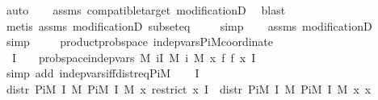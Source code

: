 \begin{isabellebody}
\ auto{\isacharbrackleft}{\kern0pt}{}{\isacharbrackright}{\kern0pt}\isanewline
\ \ \isamarkupfalse%
\ assms{\isacharparenleft}{\kern0pt}{}{\isacharparenright}{\kern0pt}\ compatible{\isacharunderscore}{\kern0pt}target\ modificationD{\isacharparenleft}{\kern0pt}{}{\isacharparenright}{\kern0pt}\ \isamarkupfalse%
\ blast\isanewline
\ \ \ \ \isamarkupfalse%
\ {\isacharparenleft}{\kern0pt}metis\ assms\ modificationD{\isacharparenleft}{\kern0pt}{}{\isacharparenright}{\kern0pt}\ subset{\isacharunderscore}{\kern0pt}eq{\isacharparenright}{\kern0pt}\isanewline
\ \ \ \isamarkupfalse%
\ simp\isanewline
\ \ \isamarkupfalse%
\ assms{\isacharparenleft}{\kern0pt}{}{\isacharparenright}{\kern0pt}\ modificationD{\isacharparenleft}{\kern0pt}{}{\isacharparenright}{\kern0pt}\ \isamarkupfalse%
\ simp\isanewline
\ \ \isamarkupfalse%
%
\endisatagproof
{\isafoldproof}%
%
\isadelimproof
\isanewline
%
\endisadelimproof
\isanewline
{}\isamarkupfalse%
\ {\isacharparenleft}{\kern0pt}\ product{\isacharunderscore}{\kern0pt}prob{\isacharunderscore}{\kern0pt}space{\isacharparenright}{\kern0pt}\ indep{\isacharunderscore}{\kern0pt}vars{\isacharunderscore}{\kern0pt}PiM{\isacharunderscore}{\kern0pt}coordinate{\isacharcolon}{\kern0pt}\isanewline
\ \ {\isachardoublequoteopen}I\ {\isasymnoteq}\ {\isacharbraceleft}{\kern0pt}{\isacharbraceright}{\kern0pt}\ {\isasymLongrightarrow}\ prob{\isacharunderscore}{\kern0pt}space{\isachardot}{\kern0pt}indep{\isacharunderscore}{\kern0pt}vars\ {\isacharparenleft}{\kern0pt}{\isasymPi}\isactrlsub M\ i{\isasymin}I{\isachardot}{\kern0pt}\ M\ i{\isacharparenright}{\kern0pt}\ M\ {\isacharparenleft}{\kern0pt}{\isasymlambda}x\ f{\isachardot}{\kern0pt}\ f\ x{\isacharparenright}{\kern0pt}\ I{\isachardoublequoteclose}\isanewline
%
\isadelimproof
%
\endisadelimproof
%
\isatagproof
{}\isamarkupfalse%
\ {\isacharparenleft}{\kern0pt}simp\ add{\isacharcolon}{\kern0pt}\ indep{\isacharunderscore}{\kern0pt}vars{\isacharunderscore}{\kern0pt}iff{\isacharunderscore}{\kern0pt}distr{\isacharunderscore}{\kern0pt}eq{\isacharunderscore}{\kern0pt}PiM{\isacharprime}{\kern0pt}{\isacharparenright}{\kern0pt}\isanewline
\ \ \isamarkupfalse%
\ {\isachardoublequoteopen}I\ {\isasymnoteq}\ {\isacharbraceleft}{\kern0pt}{\isacharbraceright}{\kern0pt}{\isachardoublequoteclose}\isanewline
\ \ \isamarkupfalse%
\ {\isachardoublequoteopen}distr\ {\isacharparenleft}{\kern0pt}Pi\isactrlsub M\ I\ M{\isacharparenright}{\kern0pt}\ {\isacharparenleft}{\kern0pt}Pi\isactrlsub M\ I\ M{\isacharparenright}{\kern0pt}\ {\isacharparenleft}{\kern0pt}{\isasymlambda}x{\isachardot}{\kern0pt}\ restrict\ x\ I{\isacharparenright}{\kern0pt}\ {\isacharequal}{\kern0pt}\ distr\ {\isacharparenleft}{\kern0pt}Pi\isactrlsub M\ I\ M{\isacharparenright}{\kern0pt}\ {\isacharparenleft}{\kern0pt}Pi\isactrlsub M\ I\ M{\isacharparenright}{\kern0pt}\ {\isacharparenleft}{\kern0pt}{\isasymlambda}x{\isachardot}{\kern0pt}\ x{\isacharparenright}{\kern0pt}{\isachardoublequoteclose}\isanewline

\end{isabellebody}
